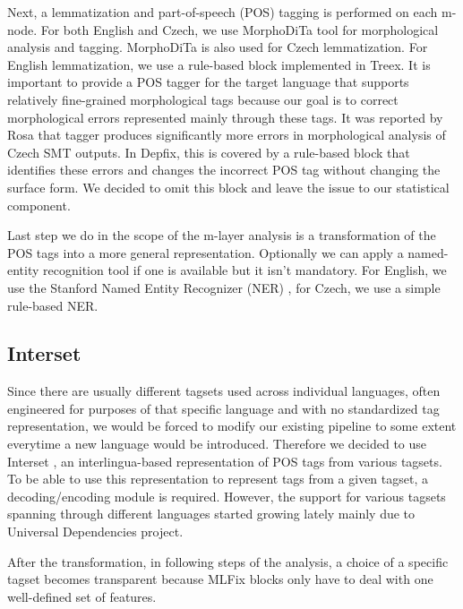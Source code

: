 Next, a lemmatization and part-of-speech (POS) tagging is performed on each m-node.
For both English and Czech, we use MorphoDiTa \citep{strakova14:morphodita}
tool for morphological analysis and tagging. MorphoDiTa is also used for Czech lemmatization.
For English lemmatization, we use a rule-based block implemented in Treex.
It is important to provide a POS tagger for the target language that supports
relatively fine-grained morphological tags because our goal is to correct morphological
errors represented mainly through these tags.
It was reported by Rosa that tagger produces significantly more
errors in morphological analysis of Czech SMT outputs. In Depfix, this is covered
by a rule-based block that identifies these errors and changes the incorrect POS tag without
changing the surface form. We decided to omit this block and leave the issue to our statistical
component.

Last step we do in the scope of the m-layer analysis is a transformation of the POS tags into
a more general representation. Optionally we can apply a named-entity recognition
tool if one is available but it isn't mandatory. For English, we use the Stanford
Named Entity Recognizer (NER) \citep{Finkel:2005:INI:1219840.1219885},
for Czech, we use a simple rule-based NER. 

\subsection{Interset}

Since there are usually different tagsets used across individual languages,
often engineered for purposes of that specific language and with no standardized
tag representation,
we would be forced to modify our existing pipeline to some extent everytime
a new language would be introduced.
Therefore we decided to use Interset \citep{biblio:ZeReusableTagset2008}, an interlingua-based
representation of POS tags from various tagsets. To be able to use this
representation to represent tags from a given tagset, a decoding/encoding
module is required. However, the support for various tagsets spanning
through different languages started growing lately mainly due to Universal Dependencies \citep{universal-dep:2016} project.

After the transformation, in following steps of the analysis, a choice
of a specific tagset becomes transparent because MLFix blocks only
have to deal with one well-defined set of features.

